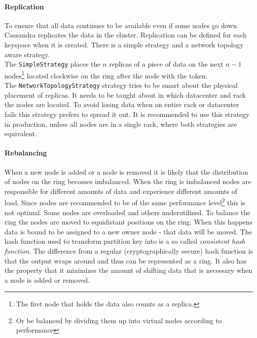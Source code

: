 \paragraph{Replication} To ensure that all data continues to be available even if some nodes go down Cassandra replicates the data in the cluster. Replication can be defined for each keyspace when it is created. There is a simple strategy and a network topology aware strategy. \autocite{datastax_replication} \\
The \texttt{SimpleStrategy} places the $n$ replicas of a piece of data on the next $n-1$ nodes\footnote{The first node that holds the data also counts as a replica.} located clockwise on the ring after the node with the token. \autocite[3]{lakshman2010cassandra} \\
The \texttt{NetworkTopologyStrategy} strategy tries to be smart about the physical placement of replicas. It needs to be taught about in which datacenter and rack the nodes are located. To avoid losing data when an entire rack or datacenter fails this strategy prefers to spread it out.
It is recommended to use this strategy in production, unless all nodes are in a single rack, where both strategies are equivalent.

\paragraph{Rebalancing}

When a new node is added or a node is removed it is likely that the distribution of nodes on the ring becomes imbalanced. When the ring is imbalanced nodes are responsible for different amounts of data and experience different amounts of load. Since nodes are recommended to be of the same performance level\footnote{Or be balanced by dividing them up into virtual nodes according to performance} this is not optimal. Some nodes are overloaded and others underutilized.
To balance the ring the nodes are moved to equidistant positions on the ring. When this happens data is bound to be assigned to a new owner node - that data will be moved. \autocite{datastax_balancing}
The hash function used to transform partition key into is a so called \textit{consistent hash function}. The difference from a regular (cryptographically secure) hash function is that the output wraps around and thus can be represented as a ring. It also has the property that it minimizes the amount of shifting data that is necessary when a node is added or removed. \autocite{karger1997consistent}

